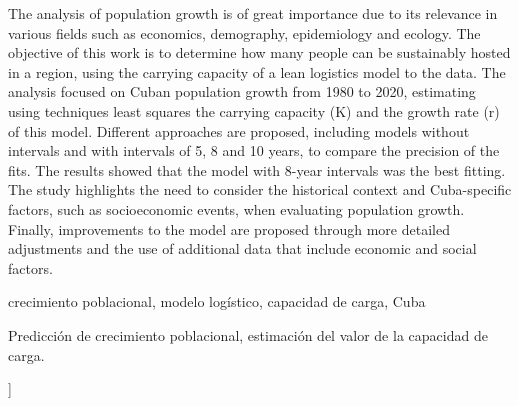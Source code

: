 \documentclass[a4paper,10pt,twocolumn]{article}
\begin{document}
\begin{enabstract}

	The analysis of population growth is of great importance due to its relevance in various fields such as
	economics, demography, epidemiology and ecology. The objective of this work is to determine how many people 
	can be sustainably hosted in a region, using the carrying capacity of a lean logistics model 
	to the data. The analysis focused on Cuban population growth from 1980 to 2020, estimating using techniques 
	least squares the carrying capacity (K) and the growth rate (r) of this model. Different approaches are proposed, 
	including models without intervals and with intervals of 5, 8 and 10 years, to compare the precision of the fits. The results 
	showed that the model with 8-year intervals was the best fitting. The study highlights the need to consider the 
	historical context and Cuba-specific factors, such as socioeconomic events, when evaluating population growth. 
	Finally, improvements to the model are proposed through more detailed adjustments and the use of additional data that include economic and social factors.

\end{enabstract}

\begin{keywords}
	crecimiento poblacional, 
	modelo logístico, 
	capacidad de carga, 
	Cuba
\end{keywords}

\begin{topics}
	Predicción de crecimiento poblacional, estimación del valor de la capacidad de carga.
\end{topics}


\vspace{0.8cm}
]


\end{document}
